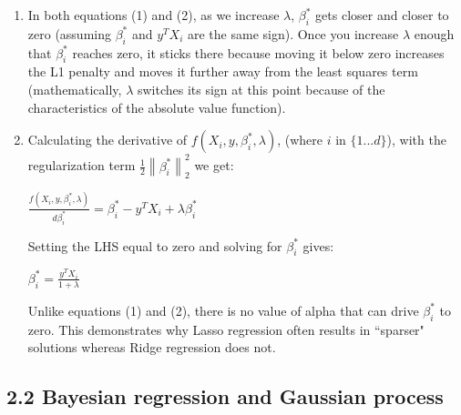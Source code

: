 \documentclass{article}
\newcommand{\norm}[1]{\left\lVert#1\right\rVert}
\begin{document}
\begin{enumerate}
\item %

In both equations (1) and (2), as we increase $\lambda$, $\beta_i^\ast$ gets closer and closer to zero
(assuming $\beta_i^\ast$ and $y^TX_i$ are the same sign).
Once you increase $\lambda$ enough that $\beta_i^\ast$ reaches zero, it sticks there because moving it below zero
increases the L1 penalty and moves it further away from the least squares term (mathematically, $\lambda$ switches
its sign at this point because of the characteristics of the absolute value function). 

\item %

Calculating the derivative of $f(X_i,y,\beta_i^\ast,\lambda)$, (where $i$ in $\{1...d\}$),
with the regularization term $\frac{1}{2}\norm{\beta_i^\ast}_2^2$ we get: 

$\frac{f(X_i,y,\beta_i^\ast,\lambda)}{d\beta_i^\ast}=\beta_i^\ast-y^TX_i+\lambda\beta_i^\ast$

Setting the LHS equal to zero and solving for $\beta_i^\ast$ gives:

$\beta_i^\ast=\frac{y^TX_i}{1+\lambda}$

Unlike equations (1) and (2), there is no value of alpha that can drive $\beta_i^\ast$ to zero.
This demonstrates why Lasso regression often results in ``sparser" solutions whereas Ridge regression
does not.

\end{enumerate}
\subsection*{2.2 Bayesian regression and Gaussian process}
\end{document}
